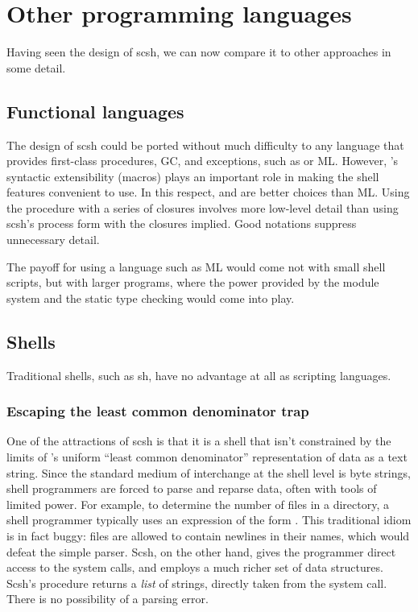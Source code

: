 \section{Other programming languages}
\label{sec:opl}
Having seen the design of scsh, 
we can now compare it to other approaches in some detail.

\subsection{Functional languages}
The design of scsh could be ported without much difficulty
to any language that provides first-class procedures, GC, and exceptions,
such as {\CommonLisp} or ML.
However, {\Scheme}'s syntactic extensibility (macros) plays an important
role in making the shell features convenient to use.
In this respect, {\Scheme} and {\CommonLisp} are better choices than ML.
Using the  procedure with a series of closures
involves more low-level detail than 
using scsh's 
process form with the closures implied.
Good notations suppress unnecessary detail.

The payoff for using a language such as ML would come not with small
shell scripts, but with larger programs, where the power provided by the
module system and the static type checking would come into play.

\subsection{Shells}
Traditional {\Unix} shells, such as sh, have no advantage at all as
scripting languages.

\subsubsection*{Escaping the least common denominator trap}
One of the attractions of scsh is that it is a {\Unix} shell that isn't
constrained by the limits of {\Unix}'s uniform ``least common denominator''
representation of data as a text string.
Since the standard medium of interchange at the shell level is {\Ascii}
byte strings, shell programmers are forced to parse and reparse data, often
with tools of limited power.
For example, to determine the number of files in a directory, a shell
programmer typically uses an expression of the form .
This traditional idiom is in fact buggy: {\Unix} files are allowed to contain
newlines in their names, which would defeat the simple  parser.
Scsh, on the other hand, gives the programmer direct access to the system
calls, and employs a much richer set of data structures.
Scsh's  procedure returns a {\em list\/} of strings,
directly taken from the system call.
There is no possibility of a parsing error.

